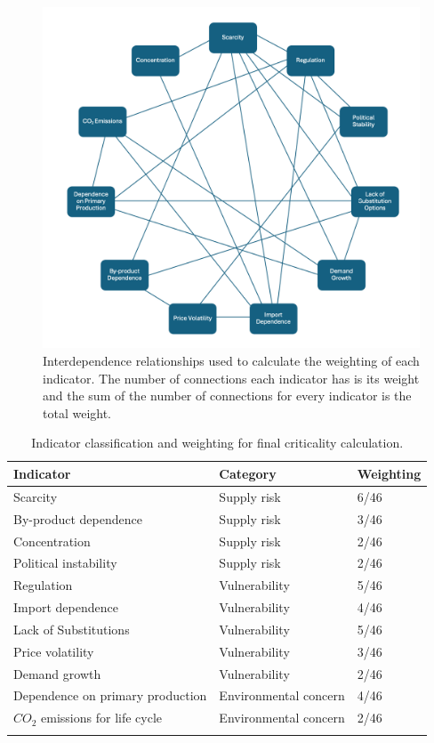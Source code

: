 \documentclass{article}
\begin{document}
\begin{figure}[hbt!]
    \centering
    \includegraphics[width=0.7\linewidth]{Screenshot 2024-03-17 at 15.37.48.png}
    \caption{Interdependence relationships used to calculate the weighting of each indicator. The number of connections each indicator has is its weight and the sum of the number of connections for every indicator is the total weight.}
    \label{fig:Figure 1}
\end{figure}


\begin{longtable}{| p{} | p{} | p{ }|} 
\hline

Indicator & Category & Weighting\\\hline
{Scarcity} & {Supply risk} & {6/46} \\\hline
{By-product dependence} & {Supply risk} & {3/46} \\\hline
{Concentration} & {Supply risk} & {2/46} \\\hline
{Political instability} &{Supply risk} & {2/46} \\\hline

{Regulation} & {Vulnerability} & {5/46} \\\hline
{Import dependence} & {Vulnerability}&{4/46} \\\hline
{Lack of Substitutions} & {Vulnerability} & {5/46} \\\hline
{Price volatility} & {Vulnerability} & {3/46} \\\hline
{Demand growth} & {Vulnerability} & {2/46} \\\hline

{Dependence on primary production} & {Environmental concern} & {4/46} \\\hline
{$CO_{2}$ emissions for life cycle} &  {Environmental concern} & {2/46} \\\hline

    \caption{Indicator classification and weighting for final criticality calculation.}
    \label{fig:Figure 1}

\end{longtable}
\end{document}
